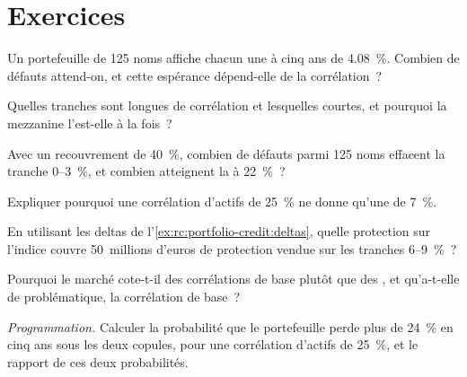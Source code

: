 \section{Exercices}

\begin{exercise}[$\star$]\label{exo:rc:portfolio-credit:1}
Un portefeuille de 125 noms affiche chacun une  à cinq ans de 4.08~\%. Combien de
défauts attend-on, et cette espérance dépend-elle de la corrélation~?
\end{exercise}

\begin{exercise}[$\star$]\label{exo:rc:portfolio-credit:2}
Quelles tranches sont longues de corrélation et lesquelles courtes, et pourquoi la mezzanine l'est-elle à la fois~?
\end{exercise}

\begin{exercise}[$\star$]\label{exo:rc:portfolio-credit:3}
Avec un recouvrement de 40~\%, combien de défauts parmi 125 noms effacent la tranche 0--3~\%, et combien
atteignent la  à 22~\%~?
\end{exercise}

\begin{exercise}[$\star\star$]\label{exo:rc:portfolio-credit:4}
Expliquer pourquoi une corrélation d'actifs de 25~\% ne donne qu'une  de 7~\%.
\end{exercise}

\begin{exercise}[$\star\star$]\label{exo:rc:portfolio-credit:5}
En utilisant les deltas de l'\cref{ex:rc:portfolio-credit:deltas}, quelle protection sur l'indice couvre
50~millions d'euros de protection vendue sur les tranches 6--9~\%~?
\end{exercise}

\begin{exercise}[$\star\star$]\label{exo:rc:portfolio-credit:6}
Pourquoi le marché cote-t-il des corrélations de base plutôt que des , et
qu'a-t-elle de problématique, la corrélation de base~?
\end{exercise}

\begin{exercise}[$\star\star\star$]\label{exo:rc:portfolio-credit:7}
\emph{Programmation.} Calculer la probabilité que le portefeuille perde plus de 24~\% en cinq ans
sous les deux copules, pour une corrélation d'actifs de 25~\%, et le rapport de ces deux probabilités.
\end{exercise}

